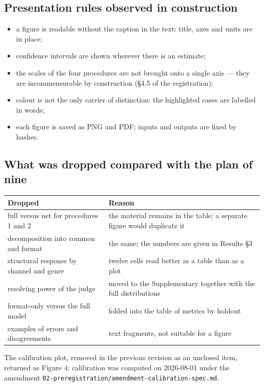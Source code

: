 \documentclass[11pt,a4paper]{article}
\renewcommand{\_}{\textunderscore\allowbreak}
\begin{document}
\subsection{Presentation rules observed in construction}

\begin{itemize}
\item a figure is readable without the caption in the text: title, axes and units are in place;
\item confidence intervals are shown wherever there is an estimate;
\item the scales of the four procedures are not brought onto a single axis — they are incommensurable by construction (§4.5 of the registration);
\item colour is not the only carrier of distinction: the highlighted cases are labelled in words;
\item each figure is saved as PNG and PDF; inputs and outputs are fixed by hashes.
\end{itemize}

\subsection{What was dropped compared with the plan of nine}

\begin{center}
\small
\begin{tabularx}{\textwidth}{lX}
\toprule
Dropped & Reason \\
\midrule
full versus net for procedures 1 and 2 & the material remains in the table; a separate figure would duplicate it \\
decomposition into common and format & the same; the numbers are given in Results §3 \\
structural response by channel and genre & twelve cells read better as a table than as a plot \\
resolving power of the judge & moved to the Supplementary together with the full distributions \\
format-only versus the full model & folded into the table of metrics by holdout \\
examples of errors and disagreements & text fragments, not suitable for a figure \\
\bottomrule
\end{tabularx}
\end{center}

The calibration plot, removed in the previous revision as an unclosed item, returned
as Figure 4: calibration was computed on 2026-08-01 under the amendment
\texttt{02-\allowbreak{}preregistration/amendment-\allowbreak{}calibration-\allowbreak{}spec.md}.
\end{document}
